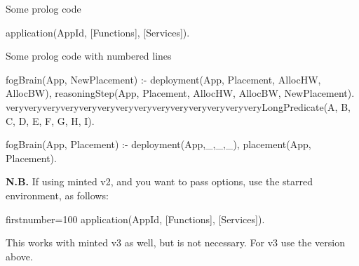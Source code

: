 \documentclass{article}
\author{}
\title{}
\begin{document}
Some prolog code

\begin{code}
	application(AppId, [Functions], [Services]).
\end{code}

Some prolog code with numbered lines

\begin{codenum}[firstnumber=1]
	fogBrain(App, NewPlacement) :-
	    deployment(App, Placement, AllocHW, AllocBW),
	    reasoningStep(App, Placement, AllocHW, AllocBW, NewPlacement).
	    veryveryveryveryveryveryveryveryveryveryveryveryveryveryLongPredicate(A, B, C, D, E, F, G, H, I).

	fogBrain(App, Placement) :-
	    \+ deployment(App,_,_,_),
	    placement(App, Placement).
\end{codenum}

\noindent \textbf{N.B.} If using minted v2, and you want to pass options, use the starred environment, as follows:
\begin{code*}{firstnumber=100}
	application(AppId, [Functions], [Services]).
\end{code*}
This works with minted v3 as well, but is not necessary. For v3 use the version above.
\end{document}
